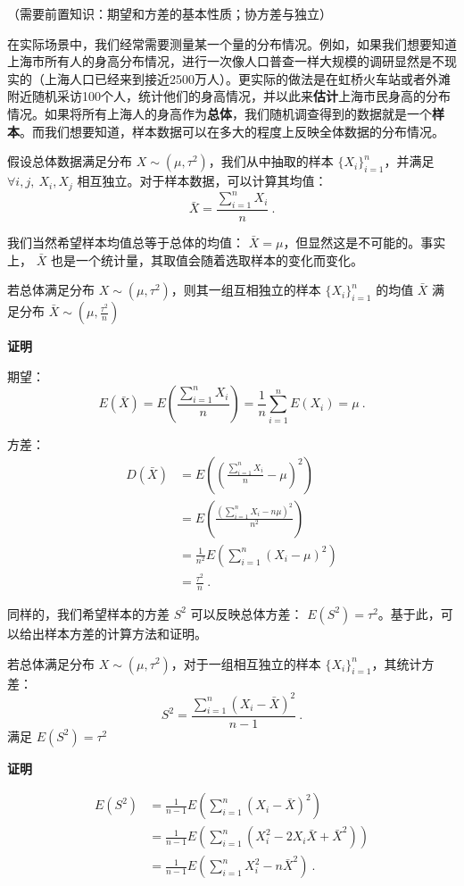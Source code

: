 
\begin{issues}
\issueDraft
\issueMissDepend
\end{issues}
（需要前置知识：期望和方差的基本性质；协方差与独立）

在实际场景中，我们经常需要测量某一个量的分布情况。例如，如果我们想要知道上海市所有人的身高分布情况，进行一次像人口普查一样大规模的调研显然是不现实的（上海人口已经来到接近2500万人）。更实际的做法是在虹桥火车站或者外滩附近随机采访100个人，统计他们的身高情况，并以此来\textbf{估计}上海市民身高的分布情况。如果将所有上海人的身高作为\textbf{总体}，我们随机调查得到的数据就是一个\textbf{样本}。而我们想要知道，样本数据可以在多大的程度上反映全体数据的分布情况。

假设总体数据满足分布 $X\sim(\mu, \tau^2)$，我们从中抽取的样本 $\{X_i \}_{i=1}^n$，并满足 $\forall i,j,\ X_i,X_j$ 相互独立。对于样本数据，可以计算其均值：\begin{equation}
\bar X=\frac{\sum_{i=1}^n X_i}{n}~.
\end{equation}

我们当然希望样本均值总等于总体的均值： $\bar X=\mu$，但显然这是不可能的。事实上， $\bar X$ 也是一个统计量，其取值会随着选取样本的变化而变化。

\begin{theorem}{}
若总体满足分布 $X\sim (\mu, \tau^2)$，则其一组互相独立的样本 $\{X_i \}_{i=1}^n$ 的均值 $\bar X$ 满足分布 $\bar X\sim (\mu, \frac{\tau^2}{n})$
\end{theorem}
\textbf{证明}

期望：
\begin{equation}
E(\bar X) =E(\frac{\sum_{i=1}^n X_i}{n}) 
        =\frac 1 n \sum_{i=1}^n E(X_i)=\mu~.
\end{equation}

方差：
\begin{equation}
\begin{aligned}
D(\bar X) &=E((\frac{\sum_{i=1}^n X_i}{n}-\mu)^2)\\
&= E(\frac{(\sum_{i=1}^n X_i-n \mu)^2}{n^2}) \\
&=\frac {1} {n^2} E(\sum_{i=1}^n (X_i-\mu)^2) \\
&=\frac {\tau^2}{n}~.
\end{aligned}
\end{equation}

同样的，我们希望样本的方差 $S^2$ 可以反映总体方差： $E(S^2)=\tau^2$。基于此，可以给出样本方差的计算方法和证明。
\begin{theorem}{}
若总体满足分布 $X\sim (\mu, \tau^2)$，对于一组相互独立的样本 $\{X_i \}_{i=1}^n$，其统计方差：
\begin{equation}
S^2 = \frac{\sum_{i=1}^n (X_i-\bar X)^2}{n-1}~.
\end{equation}
满足 $E(S^2) = \tau^2$
\end{theorem}
\textbf{证明}

\begin{equation}
\begin{aligned}
E(S^2) &= \frac {1}{n-1}E(\sum_{i=1}^n(X_i-\bar X)^2) \\
&= \frac {1}{n-1}E(\sum_{i=1}^n(X_i^2-2X_i\bar X+\bar X^2))\\
&= \frac {1}{n-1}E(\sum_{i=1}^nX_i^2-n\bar X^2)~.
\end{aligned}
\end{equation}

